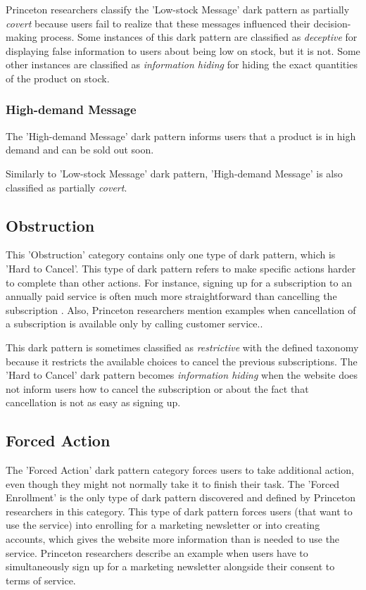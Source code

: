         Princeton researchers classify the 'Low-stock Message' dark pattern as partially \emph{covert} because users fail to realize that these messages influenced their decision-making process. Some instances of this dark pattern are classified as \emph{deceptive} for displaying false information to users about being low on stock, but it is not. Some other instances are classified as \emph{information hiding} for hiding the exact quantities of the product on stock.

        \subsubsection*{High-demand Message}
        The 'High-demand Message' dark pattern informs users that a product is in high demand and can be sold out soon.

        Similarly to 'Low-stock Message' dark pattern, 'High-demand Message' is also classified as partially \emph{covert}.

    \subsection{Obstruction}
    This 'Obstruction' category contains only one type of dark pattern, which is 'Hard to Cancel'. This type of dark pattern refers to make specific actions harder to complete than other actions. For instance, signing up for a subscription to an annually paid service is often much more straightforward than cancelling the subscription \cite{unbounce-subscription}. Also, Princeton researchers mention examples when cancellation of a subscription is available only by calling customer service.\cite{dark-patterns-at-scale}.

    This dark pattern is sometimes classified as \emph{restrictive} with the defined taxonomy because it restricts the available choices to cancel the previous subscriptions. The 'Hard to Cancel' dark pattern becomes \emph{information hiding} when the website does not inform users how to cancel the subscription or about the fact that cancellation is not as easy as signing up.

    \subsection{Forced Action}
    The 'Forced Action' dark pattern category forces users to take additional action, even though they might not normally take it to finish their task. The 'Forced Enrollment' is the only type of dark pattern discovered and defined by Princeton researchers in this category. This type of dark pattern forces users (that want to use the service) into enrolling for a marketing newsletter or into creating accounts, which gives the website more information than is needed to use the service. Princeton researchers describe an example when users have to simultaneously sign up for a marketing newsletter alongside their consent to terms of service.
    
